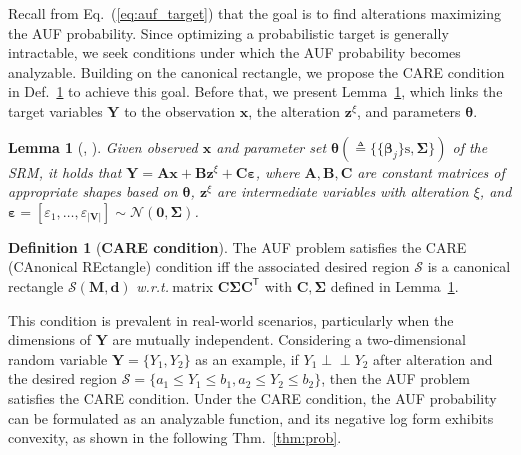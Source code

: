 \documentclass{article}
\theoremstyle{plain}
\newtheorem{lemma}[theorem]{Lemma}
\theoremstyle{definition}
\newtheorem{definition}[theorem]{Definition}
\def \x {\mathbf{x}}
\def \M {\mathbf{M}}
\def \V {\mathbf{V}}
\def \Y{\mathbf{Y}}
\def \wrt {\textit{w.r.t.}$\ $}
\def \Eq {Eq.}
\def \thm {Thm.}
\def \x {\mathbf{x}}
\def \V {\mathbf{V}}
\def \sS {\mathcal{S}}
\def \Y {\mathbf{Y}}
\def \M {\mathbf{M}}
\def \V {\mathbf{V}}
\def \C {\mathbf{C}}
\def \z {\mathbf{z}}
\def \d {\mathbf{d}}
\begin{document}
Recall from \Eq~(\ref{eq:auf_target}) that the goal is to find alterations maximizing the AUF probability. 
Since optimizing a probabilistic target is generally intractable, we seek conditions under which the AUF probability becomes analyzable. 
Building on the canonical rectangle, we propose the CARE condition in Def.~\ref{def:care} to achieve this goal. 
Before that, we present Lemma~\ref{lemma:identi}, which links the target variables $\Y$ to the observation $\x$, the alteration $\z^\xi$, and parameters $\bm{\theta}$.   


\begin{lemma}[\citeauthor{qint2023srm}, \citeyear{qint2023srm}]
  \label{lemma:identi}
  Given observed $\x$ and parameter set $\bm{\theta}(\triangleq \{\{\bm{\beta}_j\}\text{s}, \bm{\Sigma}\})$ of the SRM, it holds that \(
\mathbf{Y} = \mathbf{A}\x+\mathbf{B}\z^{\xi}+\mathbf{C}\bm{\varepsilon}\), 
 where $\mathbf{A},\mathbf{B},\mathbf{C}$ are constant matrices of appropriate shapes based on $\bm{\theta}$, 
 $\z^\xi$ are intermediate variables with alteration $\xi$, 
 and $\bm{\varepsilon} = [\varepsilon_{1}, \ldots, \varepsilon_{|\V|}]\sim \mathcal{N}\left(\bm{0}, \bm{\Sigma}\right)$.
\end{lemma}


\begin{definition}[\textbf{CARE condition}]
  \label{def:care}
  The AUF problem satisfies the CARE (CAnonical REctangle) condition iff the associated desired region $\sS$ is a canonical rectangle $\sS(\M, \d)$ \wrt matrix $\C\bm{\Sigma}\C^\mathsf{T}$ with $\C, \bm{\Sigma}$ defined in Lemma~\ref{lemma:identi}.
\end{definition}

This condition is prevalent in real-world scenarios, particularly when the dimensions of $\Y$ are mutually independent. 
Considering a two-dimensional random variable $\Y=\{Y_1, Y_2\}$ as an example, if $Y_1 \perp\!\!\!\perp Y_2$ after alteration and the desired region $\sS=\{a_1 \leq Y_1 \leq b_1, a_2 \leq Y_2 \leq b_2\}$, then the AUF problem satisfies the CARE condition. 
Under the CARE condition, the AUF probability can be formulated as an analyzable function, and its negative log form exhibits convexity, as shown in the following \thm~\ref{thm:prob}.
\end{document}
